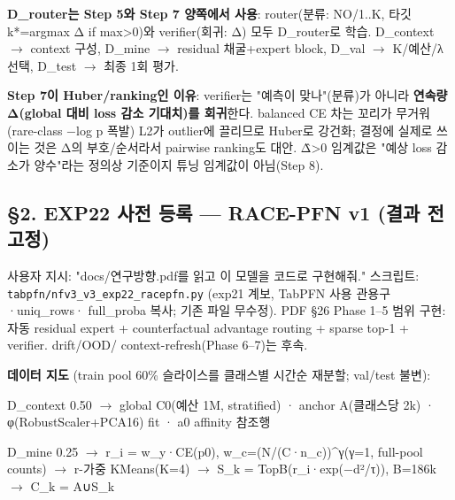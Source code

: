 \par\noindent \textbullet\enspace \textbf{D\_\allowbreak{}router는 Step 5와 Step 7 양쪽에서 사용}: router(분류: NO/\allowbreak{}1..K, 타깃 k*=\allowbreak{}argmax Δ if max>0)와 verifier(회귀: Δ) 모두 D\_\allowbreak{}router로 학습. D\_\allowbreak{}context  \ensuremath{\rightarrow}  context 구성, D\_\allowbreak{}mine  \ensuremath{\rightarrow}  residual 채굴+\allowbreak{}expert block, D\_\allowbreak{}val  \ensuremath{\rightarrow}  K/\allowbreak{}예산/\allowbreak{}λ 선택, D\_\allowbreak{}test  \ensuremath{\rightarrow}  최종 1회 평가.


\par\noindent \textbullet\enspace \textbf{Step 7이 Huber/\allowbreak{}ranking인 이유}: verifier는 "예측이 맞나"(분류)가 아니라 \textbf{연속량 Δ(global 대비 loss 감소 기대치)를 회귀}한다. balanced CE 차는 꼬리가 무거워(rare-class −log p 폭발) L2가 outlier에 끌리므로 Huber로 강건화; 결정에 실제로 쓰이는 것은 Δ의 부호/\allowbreak{}순서라서 pairwise ranking도 대안. Δ̂>0 임계값은 "예상 loss 감소가 양수"라는 정의상 기준이지 튜닝 임계값이 아님(Step 8).


\subsection{§2. EXP22 사전 등록 — RACE-PFN v1 (결과 전 고정)}
사용자 지시: "docs/\allowbreak{}연구방향.pdf를 읽고 이 모델을 코드로 구현해줘." 스크립트: \texttt{tabpfn/\allowbreak{}\allowbreak{}n\allowbreak{}fv3\_\allowbreak{}\allowbreak{}v3\_\allowbreak{}\allowbreak{}e\allowbreak{}xp22\_\allowbreak{}\allowbreak{}rac\allowbreak{}epfn.\allowbreak{}py} (exp21 계보, TabPFN 사용 관용구·uniq\_\allowbreak{}rows· full\_\allowbreak{}proba 복사; 기존 파일 무수정). PDF §26 Phase 1–5 범위 구현: 자동 residual expert +\allowbreak{} counterfactual advantage routing +\allowbreak{} sparse top-1 +\allowbreak{} verifier. drift/\allowbreak{}OOD/\allowbreak{} context-refresh(Phase 6–7)는 후속.

\textbf{데이터 지도} (train pool 60\% 슬라이스를 클래스별 시간순 재분할; val/\allowbreak{}test 불변):

\par\noindent \textbullet\enspace D\_\allowbreak{}context 0.50  \ensuremath{\rightarrow}  global C0(예산 1M, stratified) · anchor A(클래스당 2k) · φ(RobustScaler+\allowbreak{}PCA16) fit · a0 affinity 참조행


\par\noindent \textbullet\enspace D\_\allowbreak{}mine 0.25  \ensuremath{\rightarrow}  r\_\allowbreak{}i =\allowbreak{} w\_\allowbreak{}y·CE(p0), w\_\allowbreak{}c=\allowbreak{}(N/\allowbreak{}(C·n\_\allowbreak{}c))\textasciicircum{}γ(γ=\allowbreak{}1, full-pool counts)  \ensuremath{\rightarrow}  r-가중 KMeans(K=\allowbreak{}4)  \ensuremath{\rightarrow}  S\_\allowbreak{}k =\allowbreak{} TopB(r\_\allowbreak{}i·exp(−d²/\allowbreak{}τ)), B=\allowbreak{}186k  \ensuremath{\rightarrow}  C\_\allowbreak{}k =\allowbreak{} A∪S\_\allowbreak{}k


